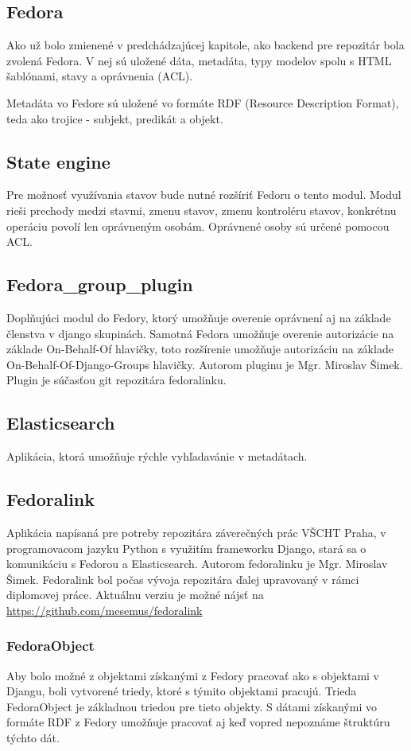 \documentclass[thesis=M,slovak]{FITthesis}[2013/05/06]
\begin{document}
\subsection{Fedora}
Ako už bolo zmienené v predchádzajúcej kapitole, ako backend pre repozitár bola zvolená Fedora. V nej sú uložené dáta, metadáta, typy modelov spolu s HTML šablónami, stavy a oprávnenia (ACL).

Metadáta vo Fedore sú uložené vo formáte RDF (Resource Description Format), teda ako trojice - subjekt, predikát a objekt.

\subsection{State engine}
Pre možnosť využívania stavov bude nutné rozšíriť Fedoru o tento modul. Modul rieši prechody medzi stavmi, zmenu stavov, zmenu kontroléru stavov, konkrétnu operáciu povolí len oprávneným osobám. Oprávnené osoby sú určené pomocou ACL.

\subsection{Fedora\_group\_plugin}
Doplňujúci modul do Fedory, ktorý umožňuje overenie oprávnení aj na základe členstva v django skupinách. Samotná Fedora umožňuje overenie autorizácie na základe On-Behalf-Of hlavičky, toto rozšírenie umožňuje autorizáciu na základe On-Behalf-Of-Django-Groups hlavičky. Autorom pluginu je Mgr. Miroslav Šimek. Plugin je súčasťou git repozitára fedoralinku.

\subsection{Elasticsearch}
Aplikácia, ktorá umožňuje rýchle vyhľadavánie v metadátach.

\subsection{Fedoralink}
Aplikácia napísaná pre potreby repozitára záverečných prác VŠCHT Praha, v programovacom jazyku Python s využitím frameworku Django, stará sa o komunikáciu s Fedorou a Elasticsearch. Autorom fedoralinku je Mgr. Miroslav Šimek. Fedoralink bol počas vývoja repozitára ďalej upravovaný v rámci diplomovej práce. Aktuálnu verziu je možné nájsť na \url{https://github.com/mesemus/fedoralink}

\subsubsection{FedoraObject}
Aby bolo možné z objektami získanými z Fedory pracovať ako s objektami v Djangu, boli vytvorené triedy, ktoré s týmito objektami pracujú. Trieda FedoraObject je základnou triedou pre tieto objekty. S dátami získanými vo formáte RDF z Fedory umožňuje pracovať aj keď vopred nepoznáme štruktúru týchto dát.
\end{document}
